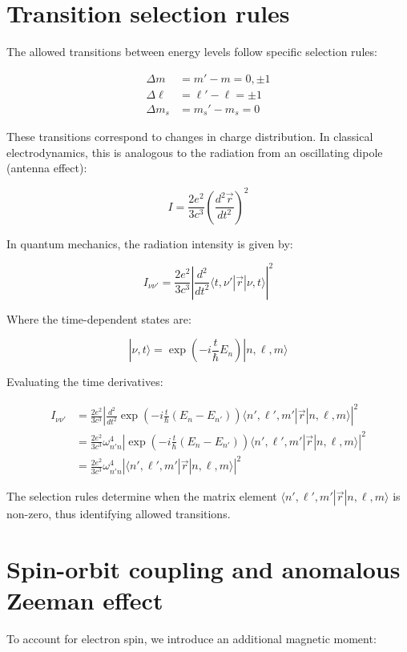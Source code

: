 \section{Transition selection rules}
The allowed transitions between energy levels follow specific selection rules:

\begin{align}
\Delta m &= m'-m=0,\pm 1 \\
\Delta\ell &= \ell'-\ell=\pm 1 \\
\Delta m_s &= m_s'-m_s=0
\end{align}

These transitions correspond to changes in charge distribution. In classical electrodynamics, this is analogous to the radiation from an oscillating dipole (antenna effect):

\begin{equation}
I=\frac{2e^2}{3c^3}\left(\frac{d^2\vec{r}}{dt^2}\right)^2
\end{equation}


In quantum mechanics, the radiation intensity is given by:

\begin{equation}
I_{\nu\nu'}=\frac{2e^2}{3c^3}\left|\frac{d^2}{dt^2}\langle t,\nu'|\vec{r}|\nu,t\rangle\right|^2
\end{equation}

Where the time-dependent states are:

\begin{equation}
|\nu,t\rangle=\exp\left(-i\frac{t}{\hbar}E_n\right)|n,\ell,m\rangle
\end{equation}

Evaluating the time derivatives:

\begin{align}
I_{\nu\nu'} &=\frac{2e^2}{3c^3}\left|\frac{d^2}{dt^2}\exp\left(-i\frac{t}{\hbar}(E_n-E_{n'})\right)\langle n',\ell',m'|\vec{r}|n,\ell,m\rangle\right|^2\\
&=\frac{2e^2}{3c^3}\omega_{n'n}^4\left|\exp\left(-i\frac{t}{\hbar}(E_n-E_{n'})\right)\langle n',\ell',m'|\vec{r}|n,\ell,m\rangle\right|^2 \\
&=\frac{2e^2}{3c^3}\omega_{n'n}^4\left|\langle n',\ell',m'|\vec{r}|n,\ell,m\rangle\right|^2
\end{align}

The selection rules determine when the matrix element $\langle n',\ell',m'|\vec{r}|n,\ell,m\rangle$ is non-zero, thus identifying allowed transitions.

\section{Spin-orbit coupling and anomalous Zeeman effect}
To account for electron spin, we introduce an additional magnetic moment:

